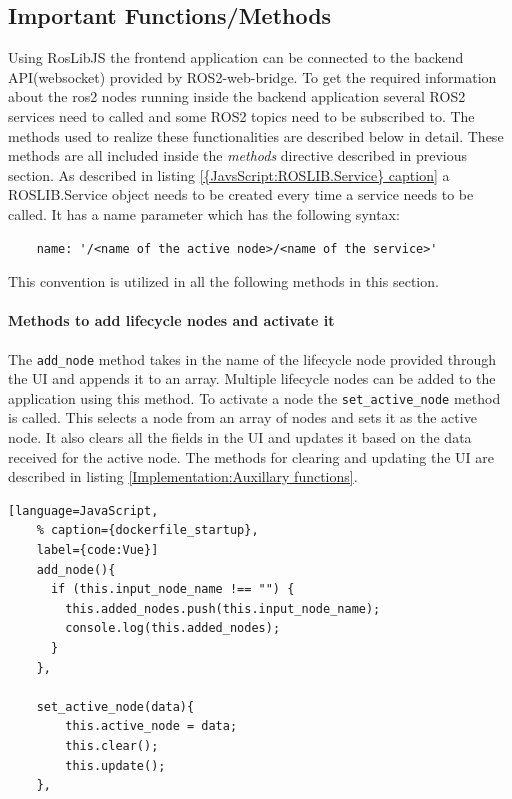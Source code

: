 \subsection{Important Functions/Methods}
\label{Implementation:ImportantFunctions}
Using RosLibJS the frontend application can be connected to the backend API(websocket) provided by ROS2-web-bridge. To get the required information about the ros2 nodes running inside the backend application several ROS2 services need to called and some ROS2 topics need to be subscribed to. The methods used to realize these functionalities are described below in detail. These methods are all included inside the \textit{methods} directive described in previous section. As described in listing \ref{{JavsScript:ROSLIB.Service} caption} a ROSLIB.Service object needs to be created every time a service needs to be called. It has a name parameter which has the 
following syntax: 
\begin{lstlisting}
	name: '/<name of the active node>/<name of the service>'
\end{lstlisting}
This convention is utilized in all the following methods in this section.

\paragraph{Methods to add lifecycle nodes and activate it} The \lstinline{add_node} method takes in the name of the lifecycle node provided through the UI and appends it to an array. Multiple lifecycle nodes can be added to the application using this method. To activate a node the \lstinline{set_active_node} method is called. This selects a node from an array of nodes and sets it as the active node. It also clears all the fields in the UI and updates it based on the data received for the active node. The methods for clearing and updating the UI are described in listing \ref{Implementation:Auxillary functions}.
\begin{lstlisting}[language=JavaScript,
	% caption={dockerfile_startup}, 
	label={code:Vue}]
	add_node(){
	  if (this.input_node_name !== "") {
		this.added_nodes.push(this.input_node_name);
		console.log(this.added_nodes);
	  } 
	},

	set_active_node(data){
		this.active_node = data;
		this.clear();
		this.update();
	},
\end{lstlisting}



